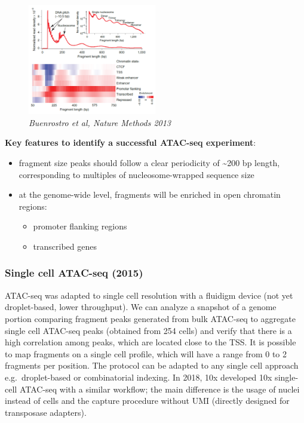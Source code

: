 \begin{figure}
\centering
\includegraphics[width=0.5\textwidth]{images/Screenshot_7.png}
\caption{\emph{Buenrostro et al, Nature Methods 2013}}
\end{figure}

\textbf{Key features to identify a successful ATAC-seq experiment}:

\begin{itemize}
\tightlist
\item
  fragment size peaks should follow a clear periodicity of
  \textasciitilde200 bp length, corresponding to multiples of
  nucleosome-wrapped sequence size
\item
  at the genome-wide level, fragments will be enriched in open chromatin
  regions:

  \begin{itemize}
  \tightlist
  \item
    promoter flanking regions
  \item
    transcribed genes
  \end{itemize}
\end{itemize}

\hypertarget{single-cell-atac-seq-2015}{%
\subsubsection{Single cell ATAC-seq
(2015)}\label{single-cell-atac-seq-2015}}

ATAC-seq was adapted to single cell resolution with a fluidigm device
(not yet droplet-based, lower throughput). We can analyze a snapshot of
a genome portion comparing fragment peaks generated from bulk ATAC-seq
to aggregate single cell ATAC-seq peaks (obtained from 254 cells) and
verify that there is a high correlation among peaks, which are located
close to the TSS. It is possible to map fragments on a single cell
profile, which will have a range from 0 to 2 fragments per position. The
protocol can be adapted to any single cell approach e.g.~droplet-based
or combinatorial indexing. In 2018, 10x developed 10x single-cell
ATAC-seq with a similar workflow; the main difference is the usage of
nuclei instead of cells and the capture procedure without UMI (directly
designed for transposase adapters).

